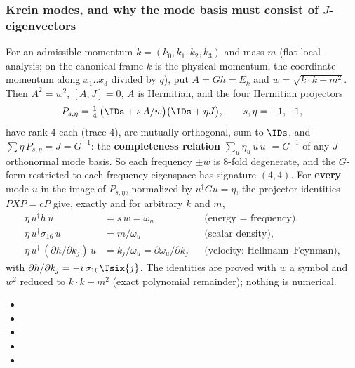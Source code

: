 \subsubsection{Krein modes, and why the mode basis must consist of \texorpdfstring{$J$}{J}-eigenvectors}
\label{sec:3.5.13}

For an admissible momentum $k=(k_0,k_1,k_2,k_3)$ and mass $m$ (flat local analysis; on the canonical
frame $k$ is the physical momentum, the coordinate momentum along $x_1..x_3$ divided by $q$), put
$A=Gh=E_k$ and $w=\sqrt{k\cdot k+m^2}$. Then $A^2=w^2$, $[A,J]=0$, $A$ is Hermitian, and the four
Hermitian projectors
\[
  P_{s,\eta}=\tfrac14\,\bigl(\IDs+s\,A/w\bigr)\bigl(\IDs+\eta J\bigr),\qquad s,\eta=+1,-1,
\]
have rank 4 each (trace 4), are mutually orthogonal, sum to $\IDs$, and
$\sum\eta\,P_{s,\eta}=J=G^{-1}$: the \textbf{completeness relation}
$\sum_u\eta_u\,u\,u^{\dagger}=G^{-1}$ of any $J$-orthonormal mode basis. So each frequency $\pm w$ is
8-fold degenerate, and the $G$-form restricted to each frequency eigenspace has signature $(4,4)$.
For \textbf{every} mode $u$ in the image of $P_{s,\eta}$, normalized by $u^{\dagger}Gu=\eta$, the
projector identities $PXP=cP$ give, exactly and for arbitrary $k$ and $m$,
\begin{align*}
  \eta\,u^{\dagger}h\,u&=s\,w=\omega_u &&\text{(energy = frequency)},\\
  \eta\,u^{\dagger}\sigma_{16}\,u&=m/\omega_u &&\text{(scalar density)},\\
  \eta\,u^{\dagger}\,(\partial h/\partial k_j)\,u&=k_j/\omega_u=\partial\omega_u/\partial k_j
    &&\text{(velocity: Hellmann--Feynman)},
\end{align*}
with $\partial h/\partial k_j=-i\,\sigma_{16}\Tsix{j}$.
The identities are proved with $w$ a symbol and $w^2$ reduced to $k\cdot k+m^2$ (exact polynomial
remainder); nothing is numerical. 
\begin{itemize}
  \item {}
  \item {}
  \item {}
  \item {}
  \item {}
\end{itemize}

